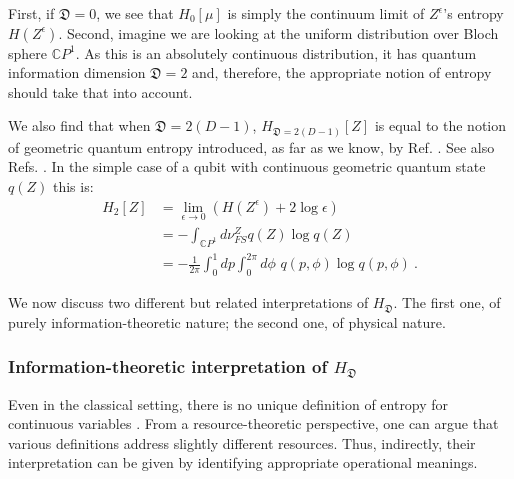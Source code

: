 \documentclass[draft,nofootinbib,pre,twocolumn,showkeys,superscriptaddress,preprintnumbers,floatfix]{revtex4-1}
\newcommand{\1}{\mathbbm{1}}
\newcommand{\CP}[1]{\mathbb{C}P^{#1}}
\newcommand{\DD}{\mathfrak{D}}
\begin{document}
First, if $\DD = 0$, we see that $H_{0}\left[\mu\right]$ is simply the
continuum limit of $Z^\epsilon$'s entropy $H(Z^\epsilon)$. Second, imagine we
are looking at the uniform distribution over Bloch sphere $\CP{1}$. As this is
an absolutely continuous distribution, it has quantum information dimension
$\DD = 2$ and, therefore, the appropriate notion of entropy should take that
into account.

We also find that when $\DD=2(D-1)$, $H_{\DD=2(D-1)}[Z]$ is equal to the notion
of geometric quantum entropy introduced, as far as we know, by Ref.
\cite{Brody2000}. See also Refs.
\cite{Brody1998,Brody2000,Brody2001,Brody2007,Brody2001,Anza20a,Anza20b,Anza20c,Brody2016}.
In the simple case of a qubit with continuous geometric quantum state $q(Z)$ this is:
\begin{align*}
H_2\left[ Z\right] & = \lim_{\epsilon \to 0}
  \left( H(Z^\epsilon) + 2\log \epsilon  \right)
  \nonumber \\
& =- \int_{\CP{1}}\!\!\! d\nu_{FS}^Z q(Z) \log q(Z)  \nonumber \\
& = -\frac{1}{2\pi}\int_{0}^1 \!\!\! dp \int_{0}^{2\pi} \!\!\! \!\!\!  d\phi  \,\,q(p,\phi) \log q(p,\phi)
  ~.
\end{align*}

We now discuss two different but related interpretations of $H_{\DD}$. The
first one, of purely information-theoretic nature; the second one, of physical
nature.

\subsubsection*{Information-theoretic interpretation of $H_{\DD}$}

Even in the classical setting, there is no unique definition of entropy for
continuous variables \cite{Rao04,Rao05}. From a resource-theoretic perspective,
one can argue that various definitions address slightly different resources.
Thus, indirectly, their interpretation can be given by identifying appropriate
operational meanings.
\end{document}
